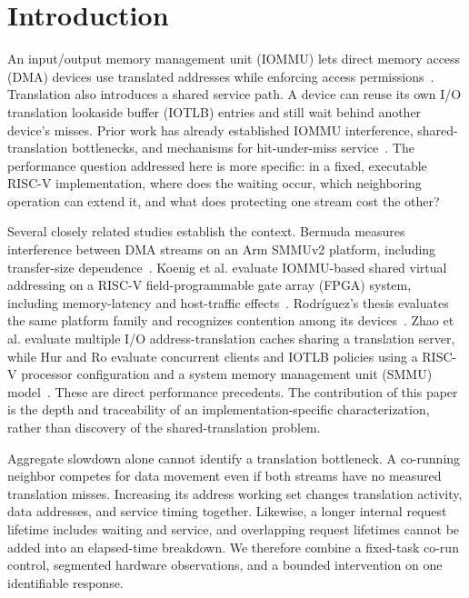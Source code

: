 \section{Introduction}
An input/output memory management unit (IOMMU) lets direct memory access (DMA) devices use translated addresses while enforcing access permissions~\cite{riscvIommu}. Translation also introduces a shared service path. A device can reuse its own I/O translation lookaside buffer (IOTLB) entries and still wait behind another device's misses. Prior work has already established IOMMU interference, shared-translation bottlenecks, and mechanisms for hit-under-miss service~\cite{bermuda2025,kurth2018,hero2017}. The performance question addressed here is more specific: in a fixed, executable RISC-V implementation, where does the waiting occur, which neighboring operation can extend it, and what does protecting one stream cost the other?

Several closely related studies establish the context. Bermuda measures interference between DMA streams on an Arm SMMUv2 platform, including transfer-size dependence~\cite{bermuda2025}. Koenig et al. evaluate IOMMU-based shared virtual addressing on a RISC-V field-programmable gate array (FPGA) system, including memory-latency and host-traffic effects~\cite{koenig2025}. Rodr\'{i}guez's thesis evaluates the same platform family and recognizes contention among its devices~\cite{rodriguez2024}. Zhao et al. evaluate multiple I/O address-translation caches sharing a translation server, while Hur and Ro evaluate concurrent clients and IOTLB policies using a RISC-V processor configuration and a system memory management unit (SMMU) model~\cite{zhao2025,hur2025}. These are direct performance precedents. The contribution of this paper is the depth and traceability of an implementation-specific characterization, rather than discovery of the shared-translation problem.

Aggregate slowdown alone cannot identify a translation bottleneck. A co-running neighbor competes for data movement even if both streams have no measured translation misses. Increasing its address working set changes translation activity, data addresses, and service timing together. Likewise, a longer internal request lifetime includes waiting and service, and overlapping request lifetimes cannot be added into an elapsed-time breakdown. We therefore combine a fixed-task co-run control, segmented hardware observations, and a bounded intervention on one identifiable response.

